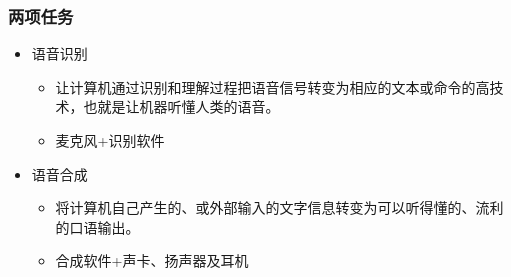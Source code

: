 \documentclass{beamer}
\newcommand{\fullPageImage}[2]{
	{
		\usebackgroundtemplate{\texttt{[image: \#1]}}
		\frame[plain]{#2}
	}
}
\begin{document}
\begin{frame}
	\frametitle{两项任务}
	\beamertemplatetransparentcovereddynamicmedium
	\begin{itemize}[<+->]
		\item 语音识别
		\begin{itemize}
			\item 让计算机通过识别和理解过程把语音信号转变为相应的文本或命令的高技术，也就是让机器听懂人类的语音。
			\item 麦克风+识别软件
		\end{itemize}
		\item 语音合成
		\begin{itemize}
			\item 将计算机自己产生的、或外部输入的文字信息转变为可以听得懂的、流利的口语输出。
			\item 合成软件+声卡、扬声器及耳机
		\end{itemize}
	\end{itemize}
\end{frame}


%
%

\fullPageImage{images/voice-recognition-demo.jpg}{\transwipe}
\fullPageImage{images/voice-recognition-principle.jpg}{\transwipe}%
\fullPageImage{images/voice-recognition-overview.eps}{\transwipe}%

\fullPageImage{images/schema_tts_work.jpg}{\transwipe}%
\end{document}
